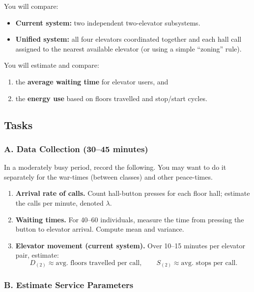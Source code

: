 \documentclass[11pt]{article}
\begin{document}
You will compare:
\begin{itemize}
    \item \textbf{Current system:} two independent two-elevator subsystems.
    \item \textbf{Unified system:} all four elevators coordinated together and each
    hall call assigned to the nearest available elevator (or using a simple
    ``zoning'' rule).
\end{itemize}

You will estimate and compare:
\begin{enumerate}
    \item the \textbf{average waiting time} for elevator users, and
    \item the \textbf{energy use} based on floors travelled and stop/start cycles.
\end{enumerate}

\subsection{Tasks}

\subsubsection{A. Data Collection (30--45 minutes)}

In a moderately busy period, record the following. You may want to do it separately for the war-times (between classes) and other peace-times.

\begin{enumerate}
    \item \textbf{Arrival rate of calls.} Count hall-button presses for each floor hall; estimate the
    calls per minute, denoted $\lambda$.
    \item \textbf{Waiting times.} For 40--60 individuals, measure the time from pressing
    the button to elevator arrival. Compute mean and variance.
    \item \textbf{Elevator movement (current system).}
    Over 10--15 minutes per elevator pair, estimate:
    \[
        D_{(2)} \approx \text{avg.\ floors travelled per call}, \qquad
        S_{(2)} \approx \text{avg.\ stops per call}.
    \]
\end{enumerate}

\subsubsection{B. Estimate Service Parameters}
\end{document}

